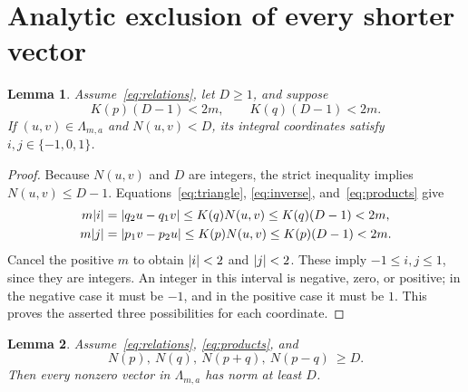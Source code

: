 \documentclass{article}
\newtheorem{lemma}{Lemma}
\DeclarePairedDelimiter{\abs}{\lvert}{\rvert}
\begin{document}
\section{Analytic exclusion of every shorter vector}\label{sec:exclusion}

\begin{lemma}\label{lem:small}
  Assume~\eqref{eq:relations}, let \(D\ge1\), and suppose
  \begin{equation}\label{eq:products}
    K(p)(D-1)<2m,\qquad K(q)(D-1)<2m.
  \end{equation}
  If \((u,v)\in\Lambda_{m,a}\) and \(N(u,v)<D\), its integral coordinates
  satisfy \(i,j\in\{-1,0,1\}\).
\end{lemma}

\begin{proof}
  Because \(N(u,v)\) and \(D\) are integers, the strict inequality
  implies \(N(u,v)\le D-1\). Equations~\eqref{eq:triangle}, \eqref{eq:inverse},
  and~\eqref{eq:products} give
  \begin{equation}\label{eq:coordbound}
    \begin{aligned}
      m\abs{i}&=\abs{q_2u-q_1v}\le K(q)N(u,v)\le K(q)(D-1)<2m,\\
      m\abs{j}&=\abs{p_1v-p_2u}\le K(p)N(u,v)\le K(p)(D-1)<2m.
    \end{aligned}
  \end{equation}
  Cancel the positive \(m\) to obtain \(\abs{i}<2\) and \(\abs{j}<2\). These imply
  \(-1\le i,j\le1\), since they are integers. An integer in this interval
  is negative, zero, or positive; in the negative case it must be \(-1\),
  and in the positive case it must be \(1\). This proves the asserted
  three possibilities for each coordinate.
\end{proof}

\begin{lemma}\label{lem:exclusion}
  Assume~\eqref{eq:relations}, \eqref{eq:products}, and
  \begin{equation}\label{eq:norms}
    N(p),\ N(q),\ N(p+q),\ N(p-q)\ \ge D.
  \end{equation}
  Then every nonzero vector in \(\Lambda_{m,a}\) has norm at least \(D\).
\end{lemma}
\end{document}
